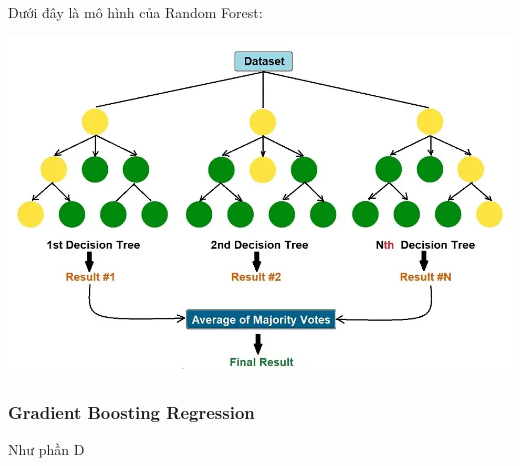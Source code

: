 \documentclass{ieeeojies}
\begin{document}
Dưới đây là mô hình của Random Forest:
\centering
\begin{minipage}{0.4\textwidth}
\includegraphics[width=1\textwidth]{bibliography/pictures/RandomForest.jpg}
\end{minipage}
\centering

\subsubsection{Gradient Boosting Regression}
Như phần D
\end{document}

